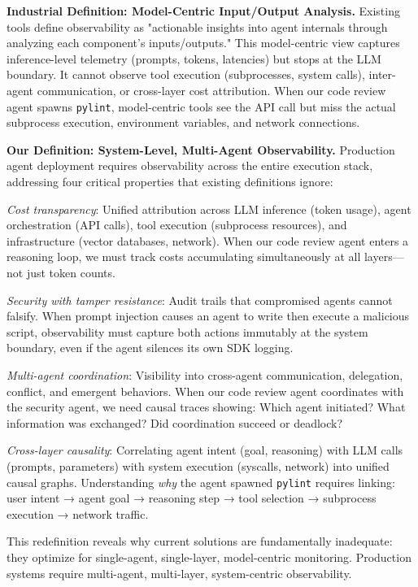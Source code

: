 \documentclass[sigplan,screen,9pt]{acmart}
\begin{document}
\textbf{Industrial Definition: Model-Centric Input/Output Analysis.} Existing tools define observability as "actionable insights into agent internals through analyzing each component's inputs/outputs." This model-centric view captures inference-level telemetry (prompts, tokens, latencies) but stops at the LLM boundary. It cannot observe tool execution (subprocesses, system calls), inter-agent communication, or cross-layer cost attribution. When our code review agent spawns \texttt{pylint}, model-centric tools see the API call but miss the actual subprocess execution, environment variables, and network connections.

\textbf{Our Definition: System-Level, Multi-Agent Observability.} Production agent deployment requires observability across the entire execution stack, addressing four critical properties that existing definitions ignore:

\emph{Cost transparency}: Unified attribution across LLM inference (token usage), agent orchestration (API calls), tool execution (subprocess resources), and infrastructure (vector databases, network). When our code review agent enters a reasoning loop, we must track costs accumulating simultaneously at all layers—not just token counts.

\emph{Security with tamper resistance}: Audit trails that compromised agents cannot falsify. When prompt injection causes an agent to write then execute a malicious script, observability must capture both actions immutably at the system boundary, even if the agent silences its own SDK logging.

\emph{Multi-agent coordination}: Visibility into cross-agent communication, delegation, conflict, and emergent behaviors. When our code review agent coordinates with the security agent, we need causal traces showing: Which agent initiated? What information was exchanged? Did coordination succeed or deadlock?

\emph{Cross-layer causality}: Correlating agent intent (goal, reasoning) with LLM calls (prompts, parameters) with system execution (syscalls, network) into unified causal graphs. Understanding \emph{why} the agent spawned \texttt{pylint} requires linking: user intent → agent goal → reasoning step → tool selection → subprocess execution → network traffic.

This redefinition reveals why current solutions are fundamentally inadequate: they optimize for single-agent, single-layer, model-centric monitoring. Production systems require multi-agent, multi-layer, system-centric observability.
\end{document}

